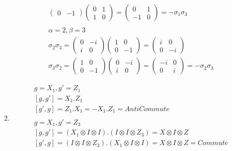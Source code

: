 \documentclass[a4paper,12pt]{article}
\begin{document}
\begin{enumerate}[label=(\alph*)]
\begin{gather*}
\begin{pmatrix}
        0 & -1
        \end{pmatrix}\begin{pmatrix}
        0 & 1\\
        1 & 0
        \end{pmatrix}=\begin{pmatrix}
        0 & 1\\
        -1 & 0
        \end{pmatrix} = - \sigma_1\sigma_3\\~\\
        \alpha = 2, \beta = 3\\
        \sigma_2\sigma_3 = \begin{pmatrix}
        0 & -i\\
        i & 0
        \end{pmatrix}\begin{pmatrix}
        1 & 0\\
        0 & -1
        \end{pmatrix} = \begin{pmatrix}
        i & 0\\
        0 & -i
        \end{pmatrix}\\
        \sigma_3\sigma_2 = \begin{pmatrix}
        1 & 0\\
        0 & -1
        \end{pmatrix}\begin{pmatrix}
        0 & -i\\
        i & 0
        \end{pmatrix}=\begin{pmatrix}
        -i & 0\\
        0 & i
        \end{pmatrix} = - \sigma_2\sigma_3
        \end{gather*}
    \item \begin{gather*}
        g=X_1, g'=Z_1\\
        [g,g'] = X_1 . Z_1 \\
        [g',g] = Z_1 . X_1 = - X_1 . Z_1 = AntiCommute\\~\\
        g=X_1, g'=Z_3 \\
        [g,g'] = (X_1 \otimes I \otimes I) . (I \otimes I \otimes Z_3 ) = X\otimes I \otimes Z\\
        [g',g] = (I \otimes I \otimes Z_3 ) . (X_1 \otimes I \otimes I) =  X \otimes I \otimes Z = Commute \\~\\

\end{gather*}
\end{enumerate}
\end{document}
